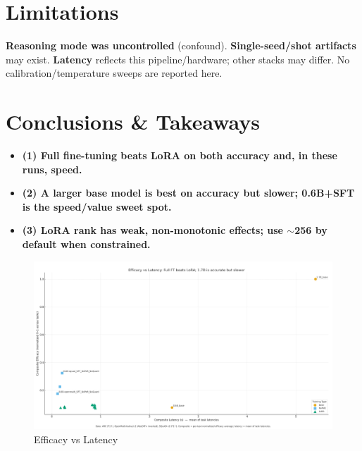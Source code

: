 \documentclass[11pt,a4paper]{article}
\begin{document}
\section{Limitations}
\textbf{Reasoning mode was uncontrolled} (confound). 
\textbf{Single-seed/shot artifacts} may exist. 
\textbf{Latency} reflects this pipeline/hardware; other stacks may differ.
No calibration/temperature sweeps are reported here.

\section{Conclusions \& Takeaways}
\begin{itemize}
  \item \textbf{(1) Full fine-tuning beats LoRA on both accuracy and, in these runs, speed.}
  \item \textbf{(2) A larger base model is best on accuracy but slower; 0.6B+SFT is the speed/value sweet spot.}
  \item \textbf{(3) LoRA rank has weak, non-monotonic effects; use $\sim$256 by default when constrained.}
\end{itemize}
\begin{figure}
    \centering
    \includegraphics[width=1\linewidth]{01_Finetuning_ModelSize_LoraR.png}
    \caption{Efficacy vs Latency}
    \label{fig:placeholder}
\end{figure}
\end{document}
